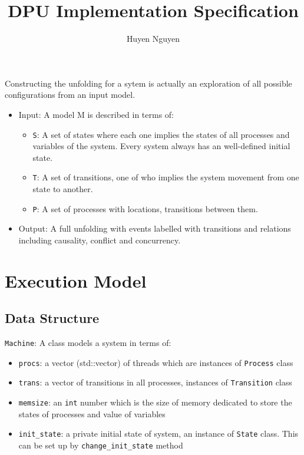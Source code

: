 \documentclass{llncs}
\title{DPU Implementation Specification}
\author{Huyen Nguyen}
\institute{Université Paris 13, Sorbonne Paris Cité, LIPN, CNRS, France}
\begin{document}
\maketitle
\noindent
Constructing the unfolding for a sytem is actually an exploration of all possible configurations from an input model.
\begin{itemize}
	\item
	 Input: A model M is described in terms of:
	 \begin{itemize}
	 	\item
		 	\verb!S!: A set of states where each one implies the states of all processes and variables of the system. Every system always has an well-defined initial state.
	 	\item
			\verb!T!: A set of transitions, one of who implies the system movement from one state to another.
	 	\item 
		 	\verb!P!: A set of processes with locations, transitions between them.
		
	 \end{itemize} 
	\item Output: A full unfolding with events labelled with transitions and relations including causality, conflict and concurrency.
\end{itemize}

\section{Execution Model}
\label{s:model}
\subsection{Data Structure}
\verb!Machine!: A class models a system in terms of:
	\begin{itemize}
	\item
		\verb!procs!: a vector (std::vector) of threads which are instances of \verb!Process! class
	\item
		\verb!trans!: a vector of transitions in all processes, instances of \verb!Transition! class 
	\item
		\verb!memsize!:	an \verb!int! number which is the size of memory dedicated to store the states of processes and
		 value of variables
	\item
		\verb!init_state!: a private initial state of system, an instance of \verb!State! class. This can be set up 
		by \verb!change_init_state! method
	\end{itemize}	
\end{document}
